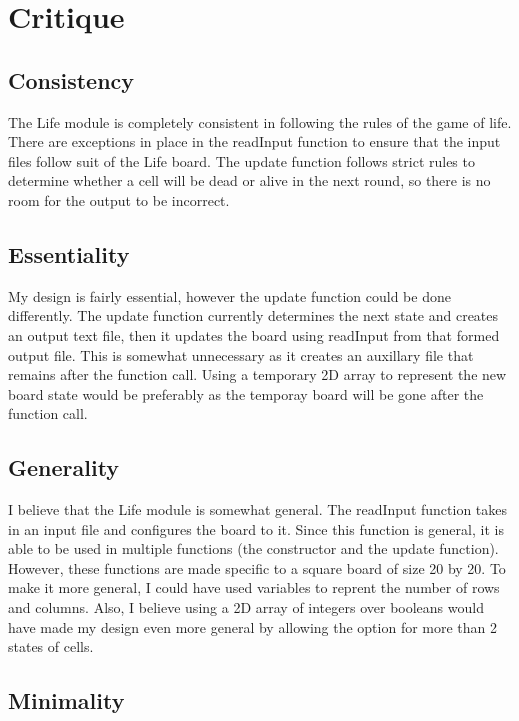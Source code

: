 \documentclass[12pt]{article}
\begin{document}
\newpage

\section* {Critique}
\subsection*{Consistency}

The Life module is completely consistent in following the rules of the game of life. There are exceptions in place in the readInput function to ensure that the input files follow suit of the Life board. The update function follows strict rules to determine whether a cell will be dead or alive in the next round, so there is no room for the output to be incorrect.  

\subsection*{Essentiality}

My design is fairly essential, however the update function could be done differently. The update function currently determines the next state and creates an output text file, then it updates the board using readInput from that formed output file. This is somewhat unnecessary as it creates an auxillary file that remains after the function call. Using a temporary 2D array to represent the new board state would be preferably as the temporay board will be gone after the function call.

\subsection*{Generality}

I believe that the Life module is somewhat general. The readInput function takes in an input file and configures the board to it. Since this function is general, it is able to be used in multiple functions (the constructor and the update function). However, these functions are made specific to a square board of size 20 by 20. To make it more general, I could have used variables to reprent the number of rows and columns. Also, I believe using a 2D array of integers over booleans would have made my design even more general by allowing the option for more than 2 states of cells. 

\subsection*{Minimality}
\end{document}
